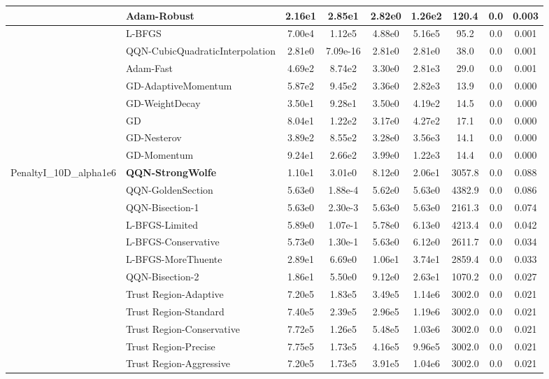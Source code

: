 \documentclass{article}
\begin{document}
\begin{longtable}{|l|l|c|c|c|c|c|c|c|}
\hline
 & Adam-Robust & 2.16e1 & 2.85e1 & 2.82e0 & 1.26e2 & 120.4 & 0.0 & 0.003 \\
\hline
 & L-BFGS & 7.00e4 & 1.12e5 & 4.88e0 & 5.16e5 & 95.2 & 0.0 & 0.001 \\
\hline
 & QQN-CubicQuadraticInterpolation & 2.81e0 & 7.09e-16 & 2.81e0 & 2.81e0 & 38.0 & 0.0 & 0.001 \\
\hline
 & Adam-Fast & 4.69e2 & 8.74e2 & 3.30e0 & 2.81e3 & 29.0 & 0.0 & 0.001 \\
\hline
 & GD-AdaptiveMomentum & 5.87e2 & 9.45e2 & 3.36e0 & 2.82e3 & 13.9 & 0.0 & 0.000 \\
\hline
 & GD-WeightDecay & 3.50e1 & 9.28e1 & 3.50e0 & 4.19e2 & 14.5 & 0.0 & 0.000 \\
\hline
 & GD & 8.04e1 & 1.22e2 & 3.17e0 & 4.27e2 & 17.1 & 0.0 & 0.000 \\
\hline
 & GD-Nesterov & 3.89e2 & 8.55e2 & 3.28e0 & 3.56e3 & 14.1 & 0.0 & 0.000 \\
\hline
 & GD-Momentum & 9.24e1 & 2.66e2 & 3.99e0 & 1.22e3 & 14.4 & 0.0 & 0.000 \\
PenaltyI\_10D\_alpha1e6 & \textbf{QQN-StrongWolfe} & 1.10e1 & 3.01e0 & 8.12e0 & 2.06e1 & 3057.8 & 0.0 & 0.088 \\
\hline
 & QQN-GoldenSection & 5.63e0 & 1.88e-4 & 5.62e0 & 5.63e0 & 4382.9 & 0.0 & 0.086 \\
\hline
 & QQN-Bisection-1 & 5.63e0 & 2.30e-3 & 5.63e0 & 5.63e0 & 2161.3 & 0.0 & 0.074 \\
\hline
 & L-BFGS-Limited & 5.89e0 & 1.07e-1 & 5.78e0 & 6.13e0 & 4213.4 & 0.0 & 0.042 \\
\hline
 & L-BFGS-Conservative & 5.73e0 & 1.30e-1 & 5.63e0 & 6.12e0 & 2611.7 & 0.0 & 0.034 \\
\hline
 & L-BFGS-MoreThuente & 2.89e1 & 6.69e0 & 1.06e1 & 3.74e1 & 2859.4 & 0.0 & 0.033 \\
\hline
 & QQN-Bisection-2 & 1.86e1 & 5.50e0 & 9.12e0 & 2.63e1 & 1070.2 & 0.0 & 0.027 \\
\hline
 & Trust Region-Adaptive & 7.20e5 & 1.83e5 & 3.49e5 & 1.14e6 & 3002.0 & 0.0 & 0.021 \\
\hline
 & Trust Region-Standard & 7.40e5 & 2.39e5 & 2.96e5 & 1.19e6 & 3002.0 & 0.0 & 0.021 \\
\hline
 & Trust Region-Conservative & 7.72e5 & 1.26e5 & 5.48e5 & 1.03e6 & 3002.0 & 0.0 & 0.021 \\
\hline
 & Trust Region-Precise & 7.75e5 & 1.73e5 & 4.16e5 & 9.96e5 & 3002.0 & 0.0 & 0.021 \\
\hline
 & Trust Region-Aggressive & 7.20e5 & 1.73e5 & 3.91e5 & 1.04e6 & 3002.0 & 0.0 & 0.021 \\

\end{longtable}
\end{document}
